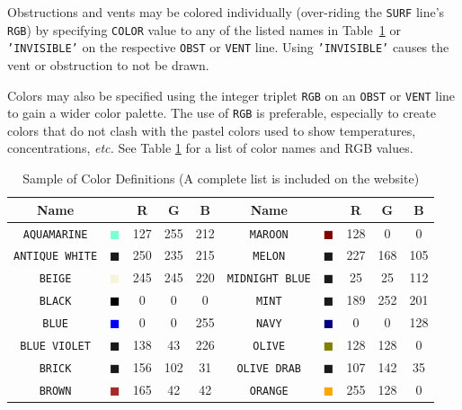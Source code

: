 \documentclass[11pt]{book}
\newcommand{\ct}{\tt\small}
\begin{document}
Obstructions and vents may be colored individually (over-riding the
{\ct SURF} line's {\ct RGB}) by specifying {\ct COLOR} value to any of
the listed names in Table~\ref{tab:colors} or {\ct 'INVISIBLE'} on
the respective {\ct OBST} or {\ct VENT} line. Using {\ct 'INVISIBLE'}
causes the vent or obstruction to not be drawn.

Colors may also be specified using the integer triplet {\ct RGB} on an {\ct OBST} or {\ct VENT} line to gain
a wider color palette. The use of {\ct RGB} is preferable, especially
to create colors that do not clash with the pastel colors used to
show temperatures, concentrations, {\em etc.} See Table \ref{tab:colors}
for a list of color names and RGB values.


\begin{table}[p]
\begin{center}
\caption{Sample of Color Definitions (A complete list is included on the website) }
\label{tab:colors}
\vspace{0.1in}
\begin{tabular}{|c|c|c|c|c|c||c|c|c|c|}
\hline
Name & &  R  & G & B & Name & & R & G & B   \\ \hline \hline
{\ct AQUAMARINE} & \textcolor{AQUAMARINE} {$\blacksquare$} & 127& 255& 212& {\ct MAROON} &  \textcolor{MAROON} {$\blacksquare$} & 128& 0& 0  \\ \hline
{\ct ANTIQUE WHITE} & \textcolor{ANTIQUE WHITE} {$\blacksquare$} & 250& 235& 215& {\ct MELON} &  \textcolor{MELON} {$\blacksquare$} & 227& 168& 105  \\ \hline
{\ct BEIGE} & \textcolor{BEIGE} {$\blacksquare$} & 245& 245& 220& {\ct MIDNIGHT BLUE} &  \textcolor{MIDNIGHT BLUE} {$\blacksquare$} & 25& 25& 112  \\ \hline
{\ct BLACK} & \textcolor{BLACK} {$\blacksquare$} & 0& 0& 0& {\ct MINT} &  \textcolor{MINT} {$\blacksquare$} & 189& 252& 201  \\ \hline
{\ct BLUE} & \textcolor{BLUE} {$\blacksquare$} & 0& 0& 255& {\ct NAVY} &  \textcolor{NAVY} {$\blacksquare$} & 0& 0& 128  \\ \hline
{\ct BLUE VIOLET} & \textcolor{BLUE VIOLET} {$\blacksquare$} & 138& 43& 226& {\ct OLIVE} &  \textcolor{OLIVE} {$\blacksquare$} & 128& 128& 0  \\ \hline
{\ct BRICK} & \textcolor{BRICK} {$\blacksquare$} & 156& 102& 31& {\ct OLIVE DRAB} &  \textcolor{OLIVE DRAB} {$\blacksquare$} & 107& 142& 35  \\ \hline
{\ct BROWN} & \textcolor{BROWN} {$\blacksquare$} & 165& 42& 42& {\ct ORANGE} &  \textcolor{ORANGE} {$\blacksquare$} & 255& 128& 0  \\ \hline

\end{tabular}
\end{center}
\end{table}
\end{document}
